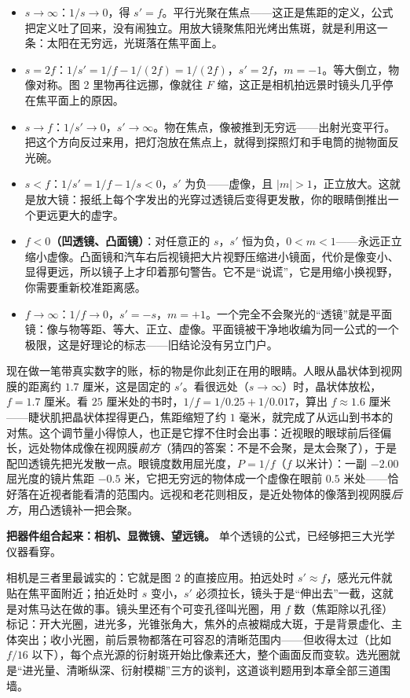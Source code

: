 \begin{mainline}
\begin{itemize}
  \item \textbf{$s\to\infty$}：$1/s\to0$，得 $s'=f$。平行光聚在焦点——这正是焦距的定义，公式把定义吐了回来，没有闹独立。用放大镜聚焦阳光烤出焦斑，就是利用这一条：太阳在无穷远，光斑落在焦平面上。
  \item \textbf{$s=2f$}：$1/s'=1/f-1/(2f)=1/(2f)$，$s'=2f$，$m=-1$。等大倒立，物像对称。图 2 里物再往远挪，像就往 $F$ 缩，这正是相机拍远景时镜头几乎停在焦平面上的原因。
  \item \textbf{$s\to f$}：$1/s'\to0$，$s'\to\infty$。物在焦点，像被推到无穷远——出射光变平行。把这个方向反过来用，把灯泡放在焦点上，就得到探照灯和手电筒的抛物面反光碗。
  \item \textbf{$s<f$}：$1/s'=1/f-1/s<0$，$s'$ 为负——虚像，且 $|m|>1$，正立放大。这就是放大镜：报纸上每个字发出的光穿过透镜后变得更发散，你的眼睛倒推出一个更远更大的虚字。
  \item \textbf{$f<0$（凹透镜、凸面镜）}：对任意正的 $s$，$s'$ 恒为负，$0<m<1$——永远正立缩小虚像。凸面镜和汽车右后视镜把大片视野压缩进小镜面，代价是像变小、显得更远，所以镜子上才印着那句警告。它不是“说谎”，它是用缩小换视野，你需要重新校准距离感。
  \item \textbf{$f\to\infty$}：$1/f\to0$，$s'=-s$，$m=+1$。一个完全不会聚光的“透镜”就是平面镜：像与物等距、等大、正立、虚像。平面镜被干净地收编为同一公式的一个极限，这是好理论的标志——旧结论没有另立门户。
\end{itemize}

现在做一笔带真实数字的账，标的物是你此刻正在用的眼睛。人眼从晶状体到视网膜的距离约 $1.7$ 厘米，这是固定的 $s'$。看很远处（$s\to\infty$）时，晶状体放松，$f=1.7$ 厘米。看 $25$ 厘米处的书时，$1/f=1/0.25+1/0.017$，算出 $f\approx1.6$ 厘米——睫状肌把晶状体捏得更凸，焦距缩短了约 $1$ 毫米，就完成了从远山到书本的对焦。这个调节量小得惊人，也正是它撑不住时会出事：近视眼的眼球前后径偏长，远处物体成像在视网膜\emph{前方}（猜四的答案：不是不会聚，是太会聚了），于是配凹透镜先把光发散一点。眼镜度数用屈光度，$P=1/f$（$f$ 以米计）：一副 $-2.00$ 屈光度的镜片焦距 $-0.5$ 米，它把无穷远的物体成一个虚像在眼前 $0.5$ 米处——恰好落在近视者能看清的范围内。远视和老花则相反，是近处物体的像落到视网膜\emph{后方}，用凸透镜补一把会聚。

\textbf{把器件组合起来：相机、显微镜、望远镜。} 单个透镜的公式，已经够把三大光学仪器看穿。

相机是三者里最诚实的：它就是图 2 的直接应用。拍远处时 $s'\approx f$，感光元件就贴在焦平面附近；拍近处时 $s$ 变小，$s'$ 必须拉长，镜头于是“伸出去”一截，这就是对焦马达在做的事。镜头里还有个可变孔径叫光圈，用 $f$ 数（焦距除以孔径）标记：开大光圈，进光多，光锥张角大，焦外的点被糊成大斑，于是背景虚化、主体突出；收小光圈，前后景物都落在可容忍的清晰范围内——但收得太过（比如 $f/16$ 以下），每个点光源的衍射斑开始比像素还大，整个画面反而变软。选光圈就是“进光量、清晰纵深、衍射模糊”三方的谈判，这道谈判题用到本章全部三道围墙。


\end{mainline}
